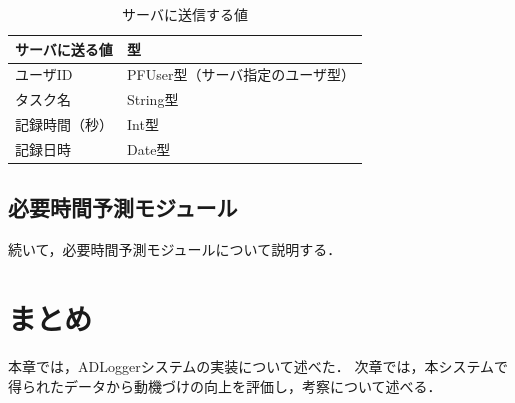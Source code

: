 \begin{table}[htb]
\begin{center}
  \begin{tabular}{|l|l|} \hline
    サーバに送る値 & 型 \\ \hline
    ユーザID & PFUser型（サーバ指定のユーザ型） \\
    タスク名 & String型 \\
    記録時間（秒） & Int型 \\
    記録日時 & Date型 \\
	\hline
  \end{tabular}
  \caption{サーバに送信する値}
  \label{tb:study_record}
\end{center}
\end{table}

\subsection{必要時間予測モジュール}
続いて，必要時間予測モジュールについて説明する．

\section{まとめ}
本章では，ADLoggerシステムの実装について述べた．
次章では，本システムで得られたデータから動機づけの向上を評価し，考察について述べる．

